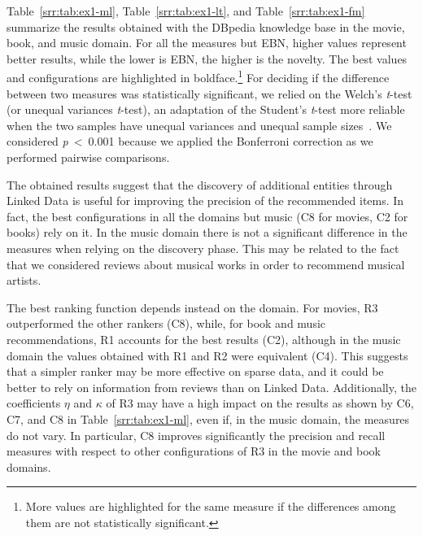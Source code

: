 Table~\ref{srr:tab:ex1-ml}, Table~\ref{srr:tab:ex1-lt}, and Table~\ref{srr:tab:ex1-fm} summarize the results obtained with the DBpedia knowledge base in the movie, book, and music domain. For all the measures but EBN, higher values represent better results, while the lower is EBN, the higher is the novelty. The best values and configurations are highlighted in boldface.\footnote{More values are highlighted for the same measure if the differences among them are not statistically significant.} For deciding if the difference between two measures was statistically significant, we relied on the Welch's \emph{t}-test (or unequal variances \emph{t}-test), an adaptation of the Student's \emph{t}-test more reliable when the two samples have unequal variances and unequal sample sizes~\cite{Ruxton2006}. We considered \emph{p}~<~0.001 because we applied the Bonferroni correction as we performed pairwise comparisons.

The obtained results suggest that the discovery of additional entities through Linked Data is useful for improving the precision of the recommended items. In fact, the best configurations in all the domains but music (C8 for movies, C2 for books) rely on it. In the music domain there is not a significant difference in the measures when relying on the discovery phase. This may be related to the fact that we considered reviews about musical works in order to recommend musical artists.

The best ranking function depends instead on the domain. For movies, R3 outperformed the other rankers (C8), while, for book and music recommendations, R1 accounts for the best results (C2), although in the music domain the values obtained with R1 and R2 were equivalent (C4). This suggests that a simpler ranker may be more effective on sparse data, and it could be better to rely on information from reviews than on Linked Data. Additionally, the coefficients $\eta$ and $\kappa$ of R3 may have a high impact on the results as shown by C6, C7, and C8 in Table~\ref{srr:tab:ex1-ml}, even if, in the music domain, the measures do not vary. In particular, C8 improves significantly the precision and recall measures with respect to other configurations of R3 in the movie and book domains.

